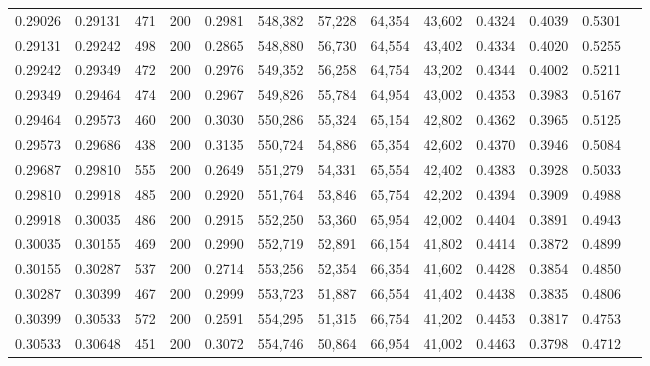 \begin{tabular}{rrrrrrrrrrrrr}
0.29026 & 0.29131 &    471 & 200 &                                     0.2981 & 548,382 &  57,228 &  64,354 &  43,602 & 0.4324 & 0.4039 & 0.5301 \\
0.29131 & 0.29242 &    498 & 200 &                                     0.2865 & 548,880 &  56,730 &  64,554 &  43,402 & 0.4334 & 0.4020 & 0.5255 \\
0.29242 & 0.29349 &    472 & 200 &                                     0.2976 & 549,352 &  56,258 &  64,754 &  43,202 & 0.4344 & 0.4002 & 0.5211 \\
0.29349 & 0.29464 &    474 & 200 &                                     0.2967 & 549,826 &  55,784 &  64,954 &  43,002 & 0.4353 & 0.3983 & 0.5167 \\
0.29464 & 0.29573 &    460 & 200 &                                     0.3030 & 550,286 &  55,324 &  65,154 &  42,802 & 0.4362 & 0.3965 & 0.5125 \\
0.29573 & 0.29686 &    438 & 200 &                                     0.3135 & 550,724 &  54,886 &  65,354 &  42,602 & 0.4370 & 0.3946 & 0.5084 \\
0.29687 & 0.29810 &    555 & 200 &                                     0.2649 & 551,279 &  54,331 &  65,554 &  42,402 & 0.4383 & 0.3928 & 0.5033 \\
0.29810 & 0.29918 &    485 & 200 &                                     0.2920 & 551,764 &  53,846 &  65,754 &  42,202 & 0.4394 & 0.3909 & 0.4988 \\
0.29918 & 0.30035 &    486 & 200 &                                     0.2915 & 552,250 &  53,360 &  65,954 &  42,002 & 0.4404 & 0.3891 & 0.4943 \\
0.30035 & 0.30155 &    469 & 200 &                                     0.2990 & 552,719 &  52,891 &  66,154 &  41,802 & 0.4414 & 0.3872 & 0.4899 \\
0.30155 & 0.30287 &    537 & 200 &                                     0.2714 & 553,256 &  52,354 &  66,354 &  41,602 & 0.4428 & 0.3854 & 0.4850 \\
0.30287 & 0.30399 &    467 & 200 &                                     0.2999 & 553,723 &  51,887 &  66,554 &  41,402 & 0.4438 & 0.3835 & 0.4806 \\
0.30399 & 0.30533 &    572 & 200 &                                     0.2591 & 554,295 &  51,315 &  66,754 &  41,202 & 0.4453 & 0.3817 & 0.4753 \\
0.30533 & 0.30648 &    451 & 200 &                                     0.3072 & 554,746 &  50,864 &  66,954 &  41,002 & 0.4463 & 0.3798 & 0.4712 \\

\end{tabular}
